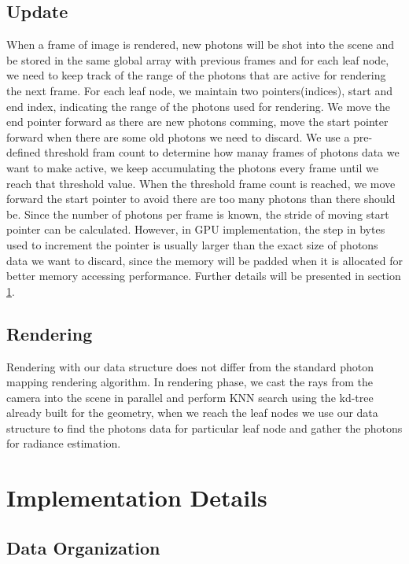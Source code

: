 \subsection{Update} 

When a frame of image is rendered, new photons will be shot into the scene and be stored in the same global array with previous frames and for each leaf node, we need to keep track of the range of the photons that are active for rendering the next frame. For each leaf node, we maintain two pointers(indices), start and end index, indicating the range of the photons used for rendering. We move the end pointer forward as there are new photons comming, move the start pointer forward when there are some old photons we need to discard. We use a pre-defined threshold fram count to determine how manay frames of photons data we want to make active, we keep accumulating the photons every frame until we reach that threshold value. When the threshold frame count 
is reached, we move forward the start pointer to avoid there are too many photons than there should be. Since the number of photons per frame is known, the stride of moving start pointer can be calculated. However, in GPU implementation, the step in bytes used to increment the pointer is usually larger than the exact size of photons data we want to discard, since the memory will be padded when it is allocated for better memory accessing performance. Further details will be presented in section \ref{sec:impl_detials}. 

\subsection{Rendering} 

Rendering with our data structure does not differ from the standard photon mapping rendering algorithm. In rendering phase, we cast the rays from the camera into the scene in parallel and perform KNN search using the kd-tree already built for the geometry, when we reach the leaf nodes we use our data structure to find the photons data for particular leaf node and gather the photons for radiance estimation. 

\section{Implementation Details} 
\label{sec:impl_detials} 

\subsection{Data Organization} 
\label{subsec:data_org}

